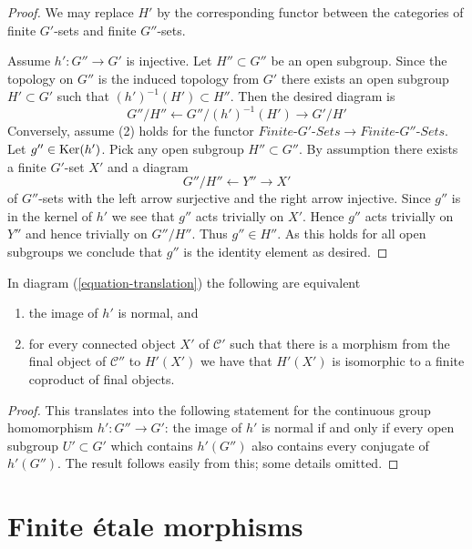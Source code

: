 \begin{proof}
We may replace $H'$ by the corresponding functor between the categories
of finite $G'$-sets and finite $G''$-sets.

\medskip\noindent
Assume $h' : G'' \to G'$ is injective. Let $H'' \subset G''$
be an open subgroup. Since the topology on $G''$ is the induced
topology from $G'$ there exists an open subgroup $H' \subset G'$
such that $(h')^{-1}(H') \subset H''$.
Then the desired diagram is
$$
G''/H'' \leftarrow G''/(h')^{-1}(H') \rightarrow G'/H'
$$
Conversely, assume (2) holds for the functor
$\textit{Finite-}G'\textit{-Sets} \to \textit{Finite-}G''\textit{-Sets}$.
Let $g'' \in \mathop{\mathrm{Ker}}(h')$. Pick any open subgroup $H'' \subset G''$.
By assumption there exists a finite $G'$-set $X'$ and a diagram
$$
G''/H'' \leftarrow Y'' \rightarrow X'
$$
of $G''$-sets with the left arrow surjective and the right arrow injective.
Since $g''$ is in the kernel of $h'$ we see that $g''$ acts trivially on $X'$.
Hence $g''$ acts trivially on $Y''$ and hence trivially on $G''/H''$.
Thus $g'' \in H''$. As this holds for all open subgroups we conclude
that $g''$ is the identity element as desired.
\end{proof}

\begin{lemma}
\label{lemma-functoriality-galois-normal}
In diagram (\ref{equation-translation}) the following are equivalent
\begin{enumerate}
\item the image of $h'$ is normal, and
\item for every connected object $X'$ of $\mathcal{C}'$ such that
there is a morphism from the final object of $\mathcal{C}''$
to $H'(X')$ we have that $H'(X')$ is isomorphic to a finite coproduct
of final objects.
\end{enumerate}
\end{lemma}

\begin{proof}
This translates into the following statement for the continuous
group homomorphism $h' : G'' \to G'$: the image of $h'$ is normal
if and only if every open subgroup $U' \subset G'$ which
contains $h'(G'')$ also contains every conjugate of $h'(G'')$.
The result follows easily from this; some details omitted.
\end{proof}






\section{Finite \'etale morphisms}
\label{section-finite-etale}

